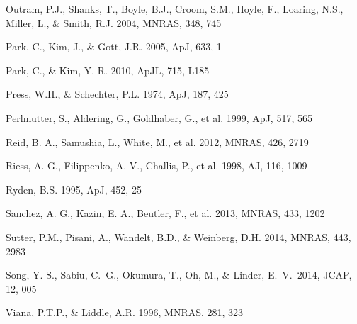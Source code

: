 \documentclass[useAMS,usenatbib]{mnras}
\begin{document}
\begin{thebibliography}{}
Outram, P.J., Shanks, T., Boyle, B.J., Croom, S.M., Hoyle, F., Loaring, N.S., 
Miller, L., \& Smith, R.J. 2004, MNRAS, 348, 745  


Park, C., Kim, J., \& Gott, J.R. 2005, ApJ, 633, 1  

Park, C., \& Kim, Y.-R. 2010, ApJL, 715, L185  

Press, W.H., \& Schechter, P.L. 1974, ApJ, 187, 425

Perlmutter, S., Aldering, G., Goldhaber, G., et al. 1999, ApJ, 517, 565  

Reid, B. A., Samushia, L., White, M., et al. 2012, MNRAS, 426, 2719  

Riess, A. G., Filippenko, A. V., Challis, P., et al. 1998, AJ, 116, 1009  


Ryden, B.S. 1995, ApJ, 452, 25  


Sanchez, A. G., Kazin, E. A., Beutler, F., et al. 2013, MNRAS, 433, 1202  

Sutter, P.M., Pisani, A., Wandelt, B.D., \& Weinberg, D.H. 2014, MNRAS, 443, 2983

 Song, Y.-S., Sabiu, C.~G., 
Okumura, T., Oh, M., \& Linder, E.~V.\ 2014, JCAP, 12, 005 



Viana, P.T.P., \& Liddle, A.R. 1996, MNRAS, 281, 323


\end{thebibliography}

\bsp

\label{lastpage}
\end{document}
